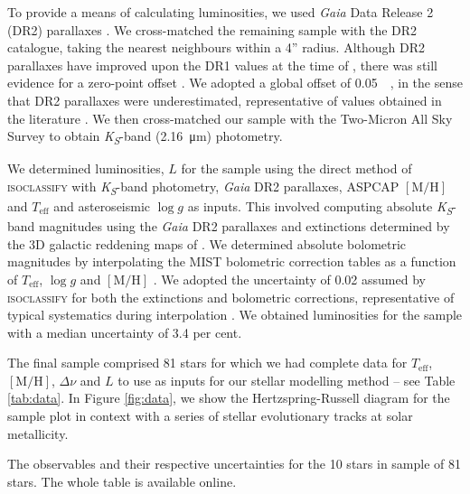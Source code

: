\documentclass[a4paper,fleqn,usenatbib]{mnras}
\newcommand{\dnu}{\ensuremath{\Delta\nu}}
\newcommand{\metallicity}{\ensuremath{[\mathrm{M}/\mathrm{H}]}}
\newcommand{\teff}{\ensuremath{T_\mathrm{eff}}}
\begin{document}
To provide a means of calculating luminosities, we used \emph{Gaia} Data Release 2 (DR2) parallaxes \citep{GaiaCollaboration.Prusti.ea2016, GaiaCollaboration.Brown.ea2018}. We cross-matched the remaining sample with the DR2 catalogue, taking the nearest neighbours within a 4'' radius. Although DR2 parallaxes have improved upon the DR1 values at the time of , there was still evidence for a zero-point offset \citep{Lindegren.Hernandez.ea2018}. We adopted a global offset of \SI{0.05}{\milli\aarcsec}, in the sense that DR2 parallaxes were underestimated, representative of values obtained in the literature \citep[see e.g.][]{Riess.Casertano.ea2018, Zinn.Pinsonneault.ea2019, Hall.Davies.ea2019, Chan.Bovy2020}. We then cross-matched our sample with the Two-Micron All Sky Survey \citep[2MASS;][]{Skrutskie.Cutri.ea2006} to obtain \emph{K\textsubscript{S}}-band (\SI{2.16}{\micro\metre}) photometry.

We determined luminosities, $L$ for the sample using the direct method of \textsc{isoclassify} \citep{Huber.Zinn.ea2017, Berger.Huber.ea2020} with \emph{K\textsubscript{S}}-band photometry, \emph{Gaia} DR2 parallaxes, ASPCAP $\metallicity$ and $\teff$ and asteroseismic $\log g$ as inputs. This involved computing absolute \emph{K\textsubscript{S}}-band magnitudes using the \emph{Gaia} DR2 parallaxes and extinctions determined by the 3D galactic reddening maps of \citet{Green.Schlafly.ea2018}. We determined absolute bolometric magnitudes by interpolating the MIST bolometric correction tables as a function of $\teff$, $\log g$ and $\metallicity$ \citep{Dotter2016, Choi.Dotter.ea2016}. We adopted the uncertainty of \SI{0.02}{\magnitude} assumed by \textsc{isoclassify} for both the extinctions and bolometric corrections, representative of typical systematics during interpolation \citep{Huber.Zinn.ea2017}. We obtained luminosities for the sample with a median uncertainty of 3.4 per cent.

The final sample comprised 81 stars for which we had complete data for $\teff$, $\metallicity$, $\dnu$ and $L$ to use as inputs for our stellar modelling method -- see Table \ref{tab:data}. In Figure \ref{fig:data}, we show the Hertzspring-Russell diagram for the sample plot in context with a series of stellar evolutionary tracks at solar metallicity.

\begin{table}
	\centering
	\caption{The observables and their respective uncertainties for the 10 stars in sample of 81 stars. The whole table is available online.}
	\label{tab:data}
	
\end{table}
\end{document}
